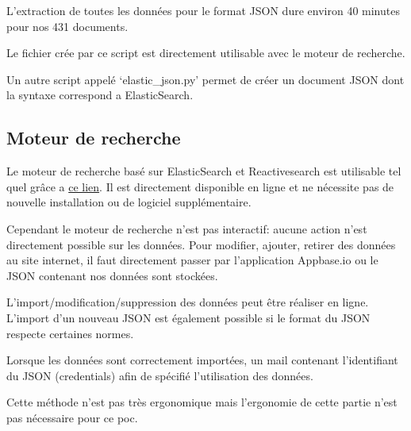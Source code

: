 L'extraction de toutes les données pour le format JSON dure environ 40 minutes pour nos 431 documents.

Le fichier crée par ce script est directement utilisable avec le moteur de recherche.

Un autre script appelé `elastic\_json.py' permet de créer un document JSON dont la syntaxe correspond a ElasticSearch.

\subsection{Moteur de recherche}
Le moteur de recherche basé sur ElasticSearch et Reactivesearch est utilisable tel quel grâce a \href{https://ujcqr.csb.app}{ce lien}.
Il est directement disponible en ligne et ne nécessite pas de nouvelle installation ou de logiciel supplémentaire.

Cependant le moteur de recherche n'est pas interactif: aucune action n'est directement possible sur les données.
Pour modifier, ajouter, retirer des données au site internet, il faut directement passer par l'application Appbase.io ou le JSON contenant nos données sont stockées.

L'import/modification/suppression des données peut être réaliser en ligne.
L'import d'un nouveau JSON est également possible si le format du JSON respecte certaines normes. 

Lorsque les données sont correctement importées, un mail contenant l'identifiant du JSON (credentials) afin de spécifié l'utilisation des données. 

Cette méthode n'est pas très ergonomique mais l'ergonomie de cette partie n'est pas nécessaire pour ce \gls{poc}\@.
